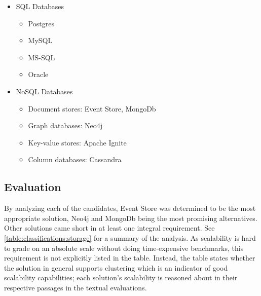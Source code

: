 \begin{itemize}[noitemsep]
\item \ac{SQL} Databases
\begin{itemize}[noitemsep]
\item Postgres
\item MySQL
\item MS-SQL
\item Oracle
\end{itemize}
\item NoSQL Databases
\begin{itemize}[noitemsep]
\item Document stores: Event Store, MongoDb
\item Graph databases: Neo4j
\item Key-value stores: Apache Ignite
\item Column databases: Cassandra
\end{itemize}
\end{itemize}

\subsection{Evaluation}

By analyzing each of the candidates, Event Store was determined to be the most appropriate solution, Neo4j and MongoDb being the most promising alternatives.
Other solutions came short in at least one integral requirement.
See \cref{table:classifications:storage} for a summary of the analysis.
As scalability is hard to grade on an absolute scale without doing time-expensive benchmarks, this requirement is not explicitly listed in the table.
Instead, the table states whether the solution in general supports clustering which is an indicator of good scalability capabilities; each solution's scalability is reasoned about in their respective passages in the textual evaluations.

